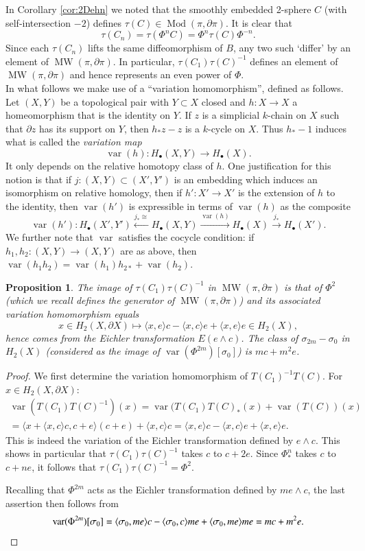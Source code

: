 \documentclass[10pt,letterpaper]{amsart}
\numberwithin{equation}{section}
\newcommand{\p}{\partial}
\def\la{\langle}
\def\ra{\rangle}
\def\pt{{\scriptscriptstyle\bullet}}
\newcommand\Mod{\operatorname{Mod}}
\newcommand\MW{\operatorname{MW}}
\newcommand\var{\operatorname{var}}
\newtheorem{proposition}[theorem]{Proposition}
\theoremstyle{remark}
\begin{document}
In Corollary \ref{cor:2Dehn} we noted that the smoothly embedded 2-sphere $C$  (with self-intersection $-2$)
defines $\tau(C)\in  \Mod(\pi, \p\pi)$. It is clear that  
\[\tau (C_n)=\tau (\Phi^nC)= \Phi^n\tau(C)\Phi^{-n}.\] 
Since each $\tau(C_n )$ lifts the same  diffeomorphism of $B$,  any two such `differ' by  an element  of  $\MW(\pi, \p \pi)$.  In particular, $\tau(C_{1})\tau(C)^{-1}$  
defines an element  of $\MW(\pi, \p \pi)$ and hence represents an even power of $\Phi$.
\\


In what follows we make use of a ``variation homomorphism'', defined as 
follows.  Let $(X,Y)$ be a topological pair with $Y\subset X$ closed and $h:X\to X$ a homeomorphism  that is  the identity on $Y$. If $z$ is  a simplicial $k$-chain on $X$ such that $\p z$ has its support on  $Y$, then $h_*z-z$ is a  $k$-cycle on $X$. Thus $h_*-1$ induces what is called the \emph{variation map}
\[
\var (h): H_\pt (X, Y)\to  H_\pt(X).
\] 
It only depends on the relative homotopy class of $h$. One justification for this notion is that if $j :(X,Y)\subset (X',Y')$ is an embedding which 
induces an isomorphism on relative homology, then if $h': X'\to X'$ is the extension of $h$ to the identity, 
then $\var(h')$ is expressible in terms of $\var (h)$ as the composite
\[
\var (h'):  H_\pt (X', Y')\xleftarrow{j_* \cong} H_\pt(X, Y)\xrightarrow{\var (h)} H_\pt (X)\xrightarrow{j_*}H_\pt(X').
\]
We further note that $\var$ satisfies the  cocycle condition: if $h_1,h_2:(X,Y)\to  (X,Y)$ are as above,  then 
$\var (h_1h_2)=\var (h_1)h_{2*} +\var(h_2)$.


\begin{proposition}\label{prop:spheres and sections}
The image of $\tau(C_{1})\tau(C)^{-1}$ in $\MW(\pi, \p \pi)$ is that of $\Phi^2$  (which we recall defines the generator 
of $\MW(\pi, \p \pi)$) and its associated variation homomorphism equals
\[
x\in H_2(X, \p X)\mapsto \la x, e\ra c- \la x,c\ra e +\la x, e\ra e\in H_2(X), 
\]
hence comes from the Eichler transformation $E(e\wedge c)$. 
The class of $\sigma_{2m}-\sigma_0$ in $H_2(X)$ (considered as the image of 
$\var(\Phi^{2m})[\sigma_0]$)  is  $mc+m^2e$.
\end{proposition}
\begin{proof}
We first determine the variation homomorphism of $T(C_{1})^{-1}T(C)$. For $x\in H_2(X, \p X)$: 
\begin{multline*}
\var(T(C_{1})T(C)^{-1})(x)=\var(T(C_{1})T(C)_*(x)+ \var(T(C))(x)\\
=\la x+\la x, c\ra c, c+e\ra (c+e)+ \la x, c\ra c
=\la x, e\ra c- \la x,c\ra e +\la x, e\ra e.
\end{multline*}
This is indeed the variation of the Eichler transformation defined by $e\wedge c$.
This  shows in particular that $\tau(C_{1})\tau(C)^{-1}$ takes $c$ to $c+2e$. Since 
$\Phi^n_*$ takes $c$ to $c+ne$, it follows that $\tau(C_{1})\tau(C)^{-1}=\Phi^2$.

Recalling that  $\Phi^{2m}$ acts as the Eichler transformation defined by $me\wedge c$, the last assertion then follows from
\[
\var(\Phi^{2m})[\sigma_0]= \la \sigma_0, me\ra c- \la \sigma_0,c\ra me +\la \sigma_0, me\ra me= mc+m^2e. \qedhere
\]
\end{proof}
\end{document}
